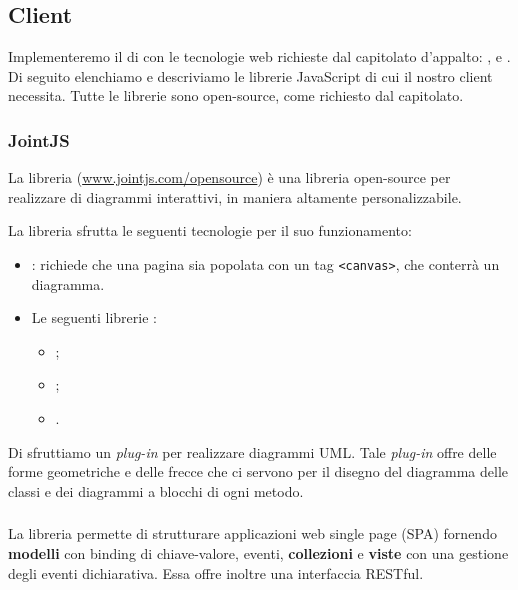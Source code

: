 


\subsection{Client} \label{sec:tech_client}
Implementeremo il  di \proj{} con le tecnologie web richieste dal capitolato d'appalto: ,  e . Di seguito elenchiamo e descriviamo le librerie JavaScript di cui il nostro client necessita. Tutte le librerie sono open-source, come richiesto dal capitolato.

\subsubsection{JointJS}
La libreria \jointjs{} (\url{www.jointjs.com/opensource}) è una libreria open-source per realizzare  di diagrammi interattivi, in maniera altamente personalizzabile.

La libreria sfrutta le seguenti tecnologie per il suo funzionamento:
\begin{itemize}
	\item \html: \jointjs{} richiede che una pagina \html{} sia popolata con un tag \texttt{<canvas>}, che conterrà un diagramma.
	\item Le seguenti librerie \js:
	\begin{itemize}
		\item \jquery;
		\item \lodash;
		\item \backbonejs.
	\end{itemize}
\end{itemize}

Di \jointjs{} sfruttiamo un \emph{plug-in} per realizzare diagrammi UML. Tale \emph{plug-in} offre delle forme geometriche e delle frecce che ci servono per il disegno del diagramma delle classi e dei diagrammi a blocchi di ogni metodo.

\subsubsection{\backbonejs}
La libreria \backbonejs{} permette di strutturare applicazioni web single page (SPA) fornendo \textbf{modelli} con binding di chiave-valore, eventi, \textbf{collezioni} e \textbf{viste} con una gestione degli eventi dichiarativa. Essa offre inoltre una interfaccia RESTful.

